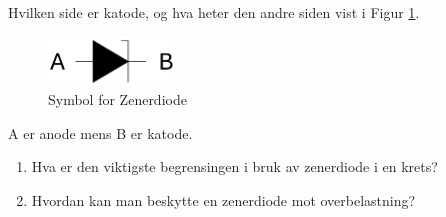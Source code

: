 \begin{question}[name=Oppgave, topic=zenerdioder]
Hvilken side er katode, og hva heter den andre siden vist i Figur \ref{fig:zenBasic}.

	\begin{figure}[H]
	\centering
	\includegraphics[width=0.3\textwidth]{diode/figurer/zenBasic.png}
	\caption{Symbol for Zenerdiode}
	\label{fig:zenBasic}
	\end{figure}

\end{question}

\vspace{0.5cm} %

\begin{solution}[name=Løsningsforslag oppgave]
A er anode mens B er katode.

\end{solution}

\begin{question}[name=Oppgave, topic=zenerdioder]


\begin{enumerate}[label=\roman*)]
	\item Hva er den viktigste begrensingen i bruk av zenerdiode i en krets?
	\item Hvordan kan man beskytte en zenerdiode mot overbelastning?
\end{enumerate}

\end{question}

\vspace{0.5cm} %

